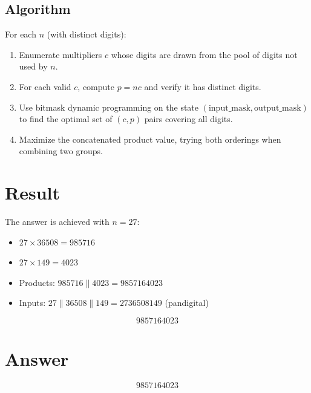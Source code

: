 \documentclass[11pt]{article}
\begin{document}
\subsection{Algorithm}
For each $n$ (with distinct digits):
\begin{enumerate}
    \item Enumerate multipliers $c$ whose digits are drawn from the pool of digits not used by $n$.
    \item For each valid $c$, compute $p = nc$ and verify it has distinct digits.
    \item Use bitmask dynamic programming on the state $(\text{input\_mask}, \text{output\_mask})$ to find the optimal set of $(c, p)$ pairs covering all digits.
    \item Maximize the concatenated product value, trying both orderings when combining two groups.
\end{enumerate}

\section{Result}
The answer is achieved with $n = 27$:
\begin{itemize}
    \item $27 \times 36508 = 985716$
    \item $27 \times 149 = 4023$
    \item Products: $985716 \| 4023 = 9857164023$
    \item Inputs: $27 \| 36508 \| 149 = 2736508149$ (pandigital)
\end{itemize}
\[
\boxed{9857164023}
\]

\section{Answer}

\[
\boxed{9857164023}
\]
\end{document}
